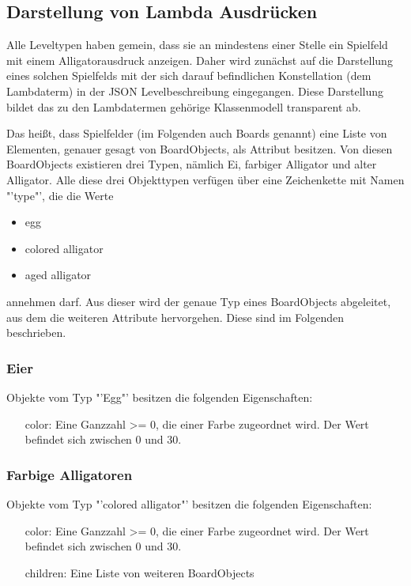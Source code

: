 \subsection{Darstellung von Lambda Ausdrücken}
Alle Leveltypen haben gemein, dass sie an mindestens einer Stelle ein Spielfeld mit einem Alligatorausdruck anzeigen.
Daher wird zunächst auf die Darstellung eines solchen Spielfelds mit der sich darauf befindlichen Konstellation (dem Lambdaterm) in der JSON Levelbeschreibung eingegangen.
Diese Darstellung bildet das zu den Lambdatermen gehörige Klassenmodell transparent ab.


Das heißt, dass Spielfelder (im Folgenden auch Boards genannt) eine Liste von Elementen, genauer gesagt von BoardObjects, als Attribut besitzen.
Von diesen BoardObjects existieren drei Typen, nämlich Ei, farbiger Alligator und alter Alligator.
Alle diese drei Objekttypen verfügen über eine Zeichenkette mit Namen "'type"', die die Werte
\begin{itemize}
	\item egg
	\item colored alligator
	\item aged alligator
\end{itemize}
annehmen darf.
Aus dieser wird der genaue Typ eines BoardObjects abgeleitet, aus dem die weiteren Attribute hervorgehen.
Diese sind im Folgenden beschrieben.

\subsubsection{Eier}
Objekte vom Typ "'Egg"' besitzen die folgenden Eigenschaften:
\begin{itemize}
	\item[color:] Eine Ganzzahl >= 0, die einer Farbe zugeordnet wird. Der Wert befindet sich zwischen 0 und 30.
\end{itemize}

\subsubsection{Farbige Alligatoren}
Objekte vom Typ "'colored alligator"' besitzen die folgenden Eigenschaften:
\begin{itemize}
	\item[color:] Eine Ganzzahl >= 0, die einer Farbe zugeordnet wird. Der Wert befindet sich zwischen 0 und 30.
	\item[children:] Eine Liste von weiteren BoardObjects
\end{itemize}

